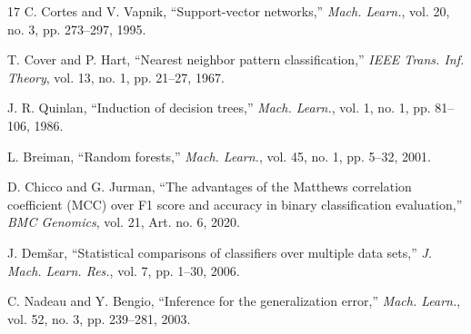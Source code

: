 \documentclass[conference,a4paper]{IEEEtran}
\begin{document}
\begin{thebibliography}{17}
 C. Cortes and V. Vapnik, ``Support-vector networks,'' \textit{Mach. Learn.}, vol. 20, no. 3, pp. 273--297, 1995.

 T. Cover and P. Hart, ``Nearest neighbor pattern classification,'' \textit{IEEE Trans. Inf. Theory}, vol. 13, no. 1, pp. 21--27, 1967.

 J. R. Quinlan, ``Induction of decision trees,'' \textit{Mach. Learn.}, vol. 1, no. 1, pp. 81--106, 1986.

 L. Breiman, ``Random forests,'' \textit{Mach. Learn.}, vol. 45, no. 1, pp. 5--32, 2001.

 D. Chicco and G. Jurman, ``The advantages of the Matthews correlation coefficient (MCC) over F1 score and accuracy in binary classification evaluation,'' \textit{BMC Genomics}, vol. 21, Art. no. 6, 2020.

 J. Dem\v{s}ar, ``Statistical comparisons of classifiers over multiple data sets,'' \textit{J. Mach. Learn. Res.}, vol. 7, pp. 1--30, 2006.

 C. Nadeau and Y. Bengio, ``Inference for the generalization error,'' \textit{Mach. Learn.}, vol. 52, no. 3, pp. 239--281, 2003.
\end{thebibliography}
\end{document}
